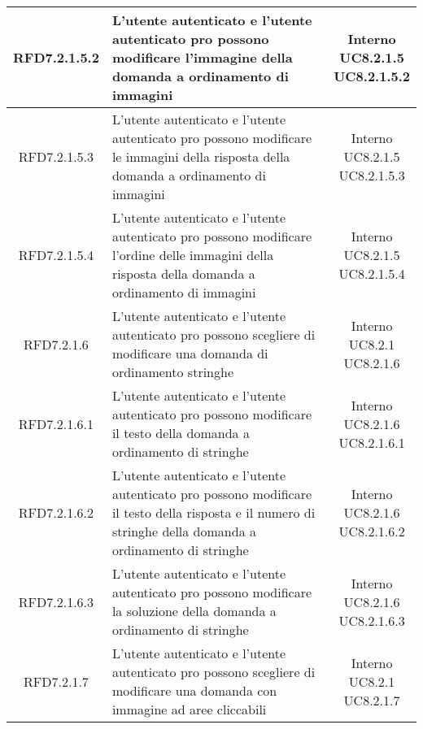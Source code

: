\begin{longtable}{|c|>{\centering}m{7cm}|c|}
			 \hypertarget{{RFD7.2.1.5.2}}{{RFD7.2.1.5.2}} & L’utente autenticato e l'utente autenticato pro possono modificare l’immagine della domanda a ordinamento di immagini  & \makecell{Interno\\ UC8.2.1.5 \\UC8.2.1.5.2 } \\ \hline
			 \hypertarget{{RFD7.2.1.5.3}}{{RFD7.2.1.5.3}} & L’utente autenticato e l'utente autenticato pro possono modificare le immagini della risposta della domanda a ordinamento di immagini & \makecell{Interno\\ UC8.2.1.5 \\UC8.2.1.5.3 } \\ \hline
			 \hypertarget{{RFD7.2.1.5.4}}{{RFD7.2.1.5.4}} & L’utente autenticato e l'utente autenticato pro possono modificare l’ordine delle immagini della risposta della domanda a ordinamento di immagini & \makecell{Interno\\ UC8.2.1.5 \\UC8.2.1.5.4 } \\ \hline
			 \hypertarget{{RFD7.2.1.6}}{{RFD7.2.1.6}} & L’utente autenticato e l’utente autenticato pro possono scegliere di modificare una domanda di ordinamento stringhe & \makecell{Interno\\ UC8.2.1 \\UC8.2.1.6 } \\ \hline
			 \hypertarget{{RFD7.2.1.6.1}}{{RFD7.2.1.6.1}} & L’utente autenticato e l'utente autenticato pro possono modificare il testo della domanda a ordinamento di stringhe & \makecell{Interno\\ UC8.2.1.6 \\UC8.2.1.6.1 } \\ \hline
			 \hypertarget{{RFD7.2.1.6.2}}{{RFD7.2.1.6.2}} & L’utente autenticato e l'utente autenticato pro possono modificare il testo della risposta e il numero di stringhe della domanda a ordinamento di stringhe & \makecell{Interno\\ UC8.2.1.6 \\UC8.2.1.6.2 } \\ \hline
			 \hypertarget{{RFD7.2.1.6.3}}{{RFD7.2.1.6.3}} & L’utente autenticato e l'utente autenticato pro possono modificare la soluzione della domanda a ordinamento di stringhe & \makecell{Interno\\ UC8.2.1.6 \\UC8.2.1.6.3 } \\ \hline
			 \hypertarget{{RFD7.2.1.7}}{{RFD7.2.1.7}} & L’utente autenticato e l’utente autenticato pro possono scegliere di modificare una domanda con immagine ad aree cliccabili & \makecell{Interno\\ UC8.2.1 \\UC8.2.1.7 } \\ \hline

\end{longtable}
